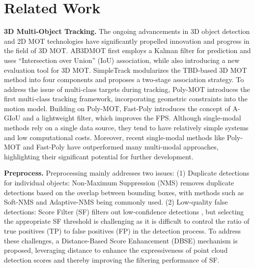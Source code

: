 \section{Related Work}
\textbf{3D Multi-Object Tracking.} The ongoing advancements in 3D object detection \cite{chenLargeKernel3DScalingKernels2023,yinCenterbased3DObject2021,xiePolyPCPolyhedralNetwork2023} and 2D MOT \cite{wojkeSimpleOnlineRealtime2017,zhang2022bytetrack} technologies have significantly propelled innovation and progress in the field of 3D MOT. AB3DMOT \cite{weng3DMultiObjectTracking2020} first employs a Kalman filter for prediction and uses “Intersection over Union” (IoU) association, while also introducing a new evaluation tool for 3D MOT. SimpleTrack \cite{pangSimpleTrackUnderstandingRethinking2021} modularizes the TBD-based 3D MOT method into four components and proposes a two-stage association strategy. To address the issue of multi-class targets during tracking, Poly-MOT \cite{liPolyMOTPolyhedralFramework2023} introduces the first multi-class tracking framework, incorporating geometric constraints into the motion model. Building on Poly-MOT, Fast-Poly \cite{240313443FastPolyFast} introduces the concept of A-GIoU and a lightweight filter, which improves the FPS. Although single-modal methods rely on a single data source, they tend to have relatively simple systems and low computational costs. Moreover, recent single-modal methods like Poly-MOT and Fast-Poly have outperformed many multi-modal approaches, highlighting their significant potential for further development.

\textbf{Preprocess.} Preprocessing mainly addresses two issues: (1) Duplicate detections for individual objects: Non-Maximum Suppression (NMS) removes duplicate detections based on the overlap between bounding boxes, with methods such as  Soft-NMS \cite{bodlaSoftNMSImprovingObject2017} and Adaptive-NMS \cite{liuAdaptiveNMSRefining2019} being commonly used. (2) Low-quality false detections: Score Filter (SF) filters out low-confidence detections \cite{liPolyMOTPolyhedralFramework2023}, but selecting the appropriate SF threshold is challenging as it is difficult to control the ratio of true positives (TP) to false positives (FP) in the detection process. To address these challenges, a Distance-Based Score Enhancement (DBSE) mechanism is proposed, leveraging distance to enhance the expressiveness of point cloud detection scores and thereby improving the filtering performance of SF.

